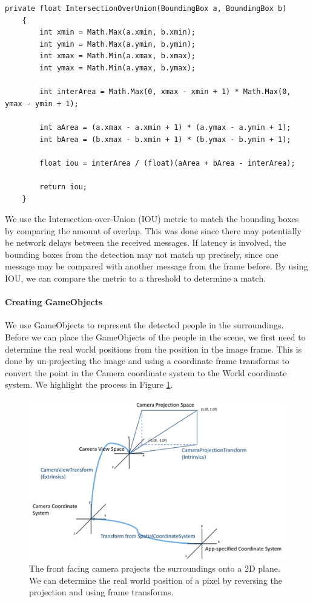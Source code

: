 \begin{lstlisting}[language={[Sharp]C},caption={IOU metric C\# implementation}]
private float IntersectionOverUnion(BoundingBox a, BoundingBox b)
    {
        int xmin = Math.Max(a.xmin, b.xmin);
        int ymin = Math.Max(a.ymin, b.ymin);
        int xmax = Math.Min(a.xmax, b.xmax);
        int ymax = Math.Min(a.ymax, b.ymax);

        int interArea = Math.Max(0, xmax - xmin + 1) * Math.Max(0, ymax - ymin + 1);

        int aArea = (a.xmax - a.xmin + 1) * (a.ymax - a.ymin + 1);
        int bArea = (b.xmax - b.xmin + 1) * (b.ymax - b.ymin + 1);

        float iou = interArea / (float)(aArea + bArea - interArea);

        return iou;
    }
\end{lstlisting}

We use the Intersection-over-Union (IOU) metric to match the bounding boxes by comparing the amount of overlap. This was done since there may potentially be network delays between the received messages. If latency is involved, the bounding boxes from the detection may not match up precisely, since one message may be compared with another message from the frame before. By using IOU, we can compare the metric to a threshold to determine a match.

\paragraph{Creating GameObjects} We use GameObjects to represent the detected people in the surroundings. Before we can place the GameObjects of the people in the scene, we first need to determine the real world positions from the position in the image frame. This is done by un-projecting the image and using a coordinate frame transforms to convert the point in the Camera coordinate system to the World coordinate system. We highlight the process in Figure \ref{fig:cameraProjection}.

\begin{figure}[ht]
    \centering
    \includegraphics[width=0.8\linewidth]{img/chapter5_implementation/CameraTransform.png}
    \caption{The front facing camera projects the surroundings onto a 2D plane. We can determine the real world position of a pixel by reversing the projection and using frame transforms.}
    \label{fig:cameraProjection}
\end{figure}

